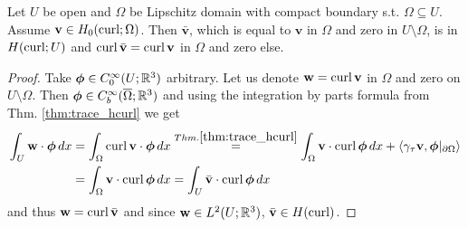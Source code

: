 \documentclass[../main.tex]{subfiles}
\begin{document}
\begin{lemma}\label{lem:extension_hcurl}
    Let $U$ be open and $\Omega$ be Lipschitz domain with compact boundary s.t.
    $\Omega \subseteq U$. Assume $\mathbf{v} \in H_0(\operatorname{curl};\Omega)$. Then 
    $\bar{\mathbf{v}}$, which is equal to $\mathbf{v}$ in $\Omega$ and zero 
    in $U \setminus \Omega$, is in $H(\operatorname{curl};U)$ and $\operatorname{curl} \bar{\mathbf{v}} = \operatorname{curl} \mathbf{v}$ 
    in $\Omega$ and zero else.
\end{lemma}
\begin{proof}
    Take $\boldsymbol{\phi} \in C_0^\infty(U;\mathbb{R}^3)$ arbitrary. Let us denote 
    $\mathbf{w} = \operatorname{curl} \mathbf{v}$ in $\Omega$ and zero on $U\setminus \Omega$.
    Then $\boldsymbol{\phi} \in C_b^\infty(\overline{\Omega};\mathbb{R}^3)$ and 
    using the integration by parts formula from Thm. \ref{thm:trace_hcurl}
    we get 
    \begin{align*}
        \int_U\mathbf{w} \cdot \boldsymbol{\phi} \, dx 
        &= \int_\Omega \operatorname{curl} \mathbf{v} \cdot \boldsymbol{\phi} \, dx
        \stackrel{Thm. \ref{thm:trace_hcurl}}{=} \int_\Omega \mathbf{v} \cdot \operatorname{curl} \boldsymbol{\phi} \, dx
            + \langle \gamma_\tau \mathbf{v}, \boldsymbol{\phi}|_{\partial \Omega}\rangle
        \\ &= \int_\Omega \mathbf{v} \cdot \operatorname{curl} \boldsymbol{\phi} \, dx
        = \int_U \bar{\mathbf{v}} \cdot \operatorname{curl} \boldsymbol{\phi} \, dx
    \end{align*}
    and thus $\mathbf{w} = \operatorname{curl} \bar{\mathbf{v}}$ and since $\mathbf{w} \in L^2(U;\mathbb{R}^3)$,
    $\bar{\mathbf{v}} \in H(\operatorname{curl})$.
\end{proof}
\end{document}

